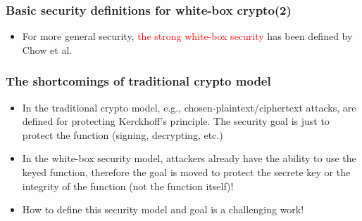 \documentclass{beamer}
\begin{document}
\frame
{
\frametitle{Basic security definitions for white-box crypto(2)}
\begin{itemize}
\item For more general security, \textcolor{red}{the strong white-box security} has been defined by Chow et al.
\end{itemize}

\begin{center}
\end{center}
}

\frame
{
\frametitle{The shortcomings of traditional crypto model}
\begin{itemize}
 \setlength{\itemsep}{12pt}
 
 \item In the traditional crypto model, e.g., chosen-plaintext/ciphertext attacks, are defined for protecting Kerckhoff's principle. The security goal is just to 
 protect the function (signing, decrypting, etc.)
 
 \item In the white-box security model, attackers already have the ability to use the keyed function, therefore the goal is moved to protect the secrete key or the integrity of the function (not the function itself)!
 
 \item How to define this security model and goal is a challenging work! 
 
\end{itemize}

}
\end{document}
